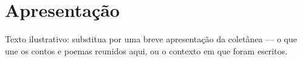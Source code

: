 \chapter*{Apresentação}

Texto ilustrativo: substitua por uma breve apresentação da coletânea ---
o que une os contos e poemas reunidos aqui, ou o contexto em que foram
escritos.
